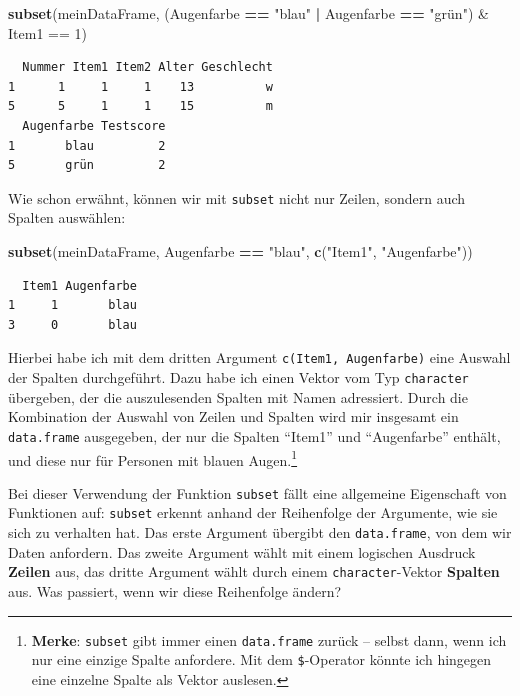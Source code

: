 \documentclass[12pt,]{tufte-book}
\newenvironment{Shaded}{\begin{snugshade}}{\end{snugshade}}
\newcommand{\KeywordTok}[1]{\textcolor[rgb]{0.13,0.29,0.53}{\textbf{#1}}}
\newcommand{\StringTok}[1]{\textcolor[rgb]{0.31,0.60,0.02}{#1}}
\newcommand{\OperatorTok}[1]{\textcolor[rgb]{0.81,0.36,0.00}{\textbf{#1}}}
\newcommand{\NormalTok}[1]{#1}
\theoremstyle{definition}
\theoremstyle{definition}
\theoremstyle{definition}
\theoremstyle{remark}
\begin{document}
\begin{Shaded}
\begin{Highlighting}[]
\KeywordTok{subset}\NormalTok{(meinDataFrame, (Augenfarbe }\OperatorTok{==}\StringTok{ "blau"} \OperatorTok{|}\StringTok{ }
\StringTok{    }\NormalTok{Augenfarbe }\OperatorTok{==}\StringTok{ "grün") & Item1 == 1)}
\end{Highlighting}
\end{Shaded}

\begin{verbatim}
  Nummer Item1 Item2 Alter Geschlecht
1      1     1     1    13          w
5      5     1     1    15          m
  Augenfarbe Testscore
1       blau         2
5       grün         2
\end{verbatim}

Wie schon erwähnt, können wir mit \texttt{subset} nicht nur Zeilen,
sondern auch Spalten auswählen:

\begin{Shaded}
\begin{Highlighting}[]
\KeywordTok{subset}\NormalTok{(meinDataFrame, Augenfarbe }\OperatorTok{==}\StringTok{ "blau"}\NormalTok{, }\KeywordTok{c}\NormalTok{(}\StringTok{"Item1"}\NormalTok{, }
    \StringTok{"Augenfarbe"}\NormalTok{))}
\end{Highlighting}
\end{Shaded}

\begin{verbatim}
  Item1 Augenfarbe
1     1       blau
3     0       blau
\end{verbatim}

Hierbei habe ich mit dem dritten Argument
\texttt{c(\textquotesingle{}Item1\textquotesingle{},\ \textquotesingle{}Augenfarbe\textquotesingle{})}
eine Auswahl der Spalten durchgeführt. Dazu habe ich einen Vektor vom
Typ \texttt{character} übergeben, der die auszulesenden Spalten mit
Namen adressiert. Durch die Kombination der Auswahl von Zeilen und
Spalten wird mir insgesamt ein \texttt{data.frame} ausgegeben, der nur
die Spalten ``Item1'' und ``Augenfarbe'' enthält, und diese nur für
Personen mit blauen Augen.\footnote{\textbf{Merke}: \texttt{subset} gibt
  immer einen \texttt{data.frame} zurück -- selbst dann, wenn ich nur
  eine einzige Spalte anfordere. Mit dem \texttt{\$}-Operator könnte ich
  hingegen eine einzelne Spalte als Vektor auslesen.}

Bei dieser Verwendung der Funktion \texttt{subset} fällt eine allgemeine
Eigenschaft von Funktionen auf: \texttt{subset} erkennt anhand der
Reihenfolge der Argumente, wie sie sich zu verhalten hat. Das erste
Argument übergibt den \texttt{data.frame}, von dem wir Daten anfordern.
Das zweite Argument wählt mit einem logischen Ausdruck \textbf{Zeilen}
aus, das dritte Argument wählt durch einem \texttt{character}-Vektor
\textbf{Spalten} aus. Was passiert, wenn wir diese Reihenfolge ändern?
\end{document}
